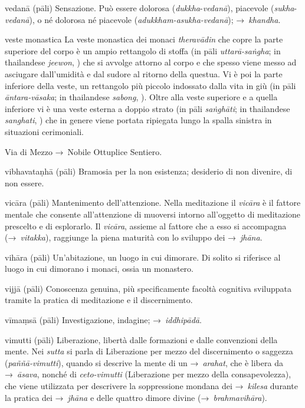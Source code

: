 \begin{glossarydescription}
\item[vedanā] (pāli)\label{glossary-vedana} Sensazione. Può essere dolorosa
  (\emph{dukkha}-\emph{vedanā}), piacevole (\emph{sukha}-\emph{vedanā}), o né
  dolorosa né piacevole (\emph{adukkham-asukha-vedanā}); →~\emph{khandha}.

\item[veste monastica] La veste monastica dei monaci \emph{theravādin} che copre
  la parte superiore del corpo è un ampio rettangolo di stoffa (in pāli
  \emph{uttarā-saṅgha}; in thailandese \emph{jeewon}, ) che si avvolge
  attorno al corpo e che spesso viene messo ad asciugare dall'umidità e dal
  sudore al ritorno della questua. Vi è poi la parte inferiore della veste, un
  rettangolo più piccolo indossato dalla vita in giù (in pāli
  \emph{āntara-vāsaka}; in thailandese \emph{sabong}, ). Oltre alla
  veste superiore e a quella inferiore vi è una veste esterna a doppio strato
  (in pāli \emph{saṅghāti}; in thailandese \emph{sanghati}, ) che in
  genere viene portata ripiegata lungo la spalla sinistra in situazioni
  cerimoniali.

\item[Via di Mezzo] →~Nobile Ottuplice Sentiero.

\item[vibhavataṇhā] (pāli) Bramosia per la non esistenza; desiderio di non
  divenire, di non essere.

\item[vicāra] (pāli) Mantenimento dell'attenzione. Nella meditazione il
  \emph{vicāra} è il fattore mentale che consente all'attenzione di muoversi
  intorno all'oggetto di meditazione prescelto e di esplorarlo. Il
  \emph{vicāra}, assieme al fattore che a esso si accompagna (→~\emph{vitakka}),
  raggiunge la piena maturità con lo sviluppo dei →~\emph{jhāna}.

\item[vihāra] (pāli) Un'abitazione, un luogo in cui dimorare. Di solito si
  riferisce al luogo in cui dimorano i monaci, ossia un monastero.

\item[vijjā] (pāli) Conoscenza genuina, più specificamente facoltà cognitiva
  sviluppata tramite la pratica di meditazione e il discernimento.

\item[vīmaṃsā] (pāli) Investigazione, indagine; →~\emph{iddhipādā}.

\item[vimutti] (pāli) Liberazione, libertà dalle formazioni e dalle convenzioni
  della mente. Nei \emph{sutta} si parla di Liberazione per mezzo del
  discernimento o saggezza (\emph{paññā-vimutti}), quando si descrive la mente
  di un →~\emph{arahat}, che è libera da →~\emph{āsava}, nonché di
  \emph{ceto-vimutti} (Liberazione per mezzo della consapevolezza), che viene
  utilizzata per descrivere la soppressione mondana dei →~\emph{kilesa} durante
  la pratica dei →~\emph{jhāna} e delle quattro dimore divine
  (→~\emph{brahmavihāra}).


\end{glossarydescription}
